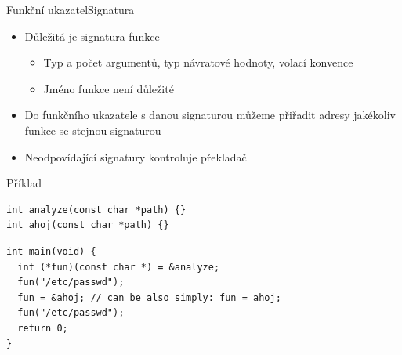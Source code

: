 \begin{frame}[fragile]{Funkční ukazatel}{Signatura}

  \begin{itemize}
    \item Důležitá je signatura funkce
    \begin{itemize}
      \item Typ a počet argumentů, typ návratové hodnoty, volací konvence
      \item Jméno funkce není důležité
    \end{itemize}

    \pause

    \item Do funkčního ukazatele s danou signaturou můžeme přiřadit adresy
      jakékoliv funkce se stejnou signaturou


    \item Neodpovídající signatury kontroluje překladač
  \end{itemize}


\begin{block}{Příklad}
\begin{lstlisting}[belowskip=0pt]
int analyze(const char *path) {}
int ahoj(const char *path) {}
\end{lstlisting}
\begin{lstlisting}
int main(void) {
  int (*fun)(const char *) = &analyze;
  fun("/etc/passwd");
  fun = &ahoj; // can be also simply: fun = ahoj;
  fun("/etc/passwd");
  return 0;
}
\end{lstlisting}
\end{block}

\end{frame}

